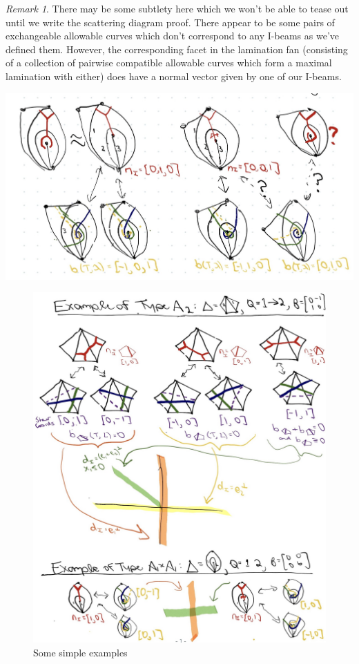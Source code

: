 \documentclass{amsart}
\theoremstyle{definition}
\theoremstyle{remark}
\newtheorem{remark}[proposition]{Remark}
\numberwithin{equation}{section}
\newcommand{\0}{{\mathbf{0}}}
\begin{document}
\begin{remark}
There may be some subtlety here which we won't be able to tease out until we write the scattering diagram proof. 
There appear to be some pairs of exchangeable allowable curves which don't correspond to any I-beams as we've defined them. However, the corresponding facet in the lamination fan (consisting of a collection of pairwise compatible allowable curves which form a maximal lamination with either) does have a normal vector given by one of our I-beams.

\includegraphics[scale=.2]{new_ibeam.jpg}
\end{remark}

\begin{figure}
\caption{Some simple examples}
\includegraphics[scale=.25]{ibeam_examples.jpg}
\end{figure}
\end{document}
